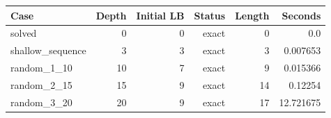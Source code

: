 {\small
\begin{tabular}{lrrrrr}
\hline
Case & Depth & Initial LB & Status & Length & Seconds \\
\hline
solved & 0 & 0 & exact & 0 & 0.0 \\
shallow\_sequence & 3 & 3 & exact & 3 & 0.007653 \\
random\_1\_10 & 10 & 7 & exact & 9 & 0.015366 \\
random\_2\_15 & 15 & 9 & exact & 14 & 0.12254 \\
random\_3\_20 & 20 & 9 & exact & 17 & 12.721675 \\
\hline
\end{tabular}
}
